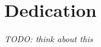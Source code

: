 
\chapter{Dedication}
\label{ch:Dedication}

\begin{epigraph}
    \emph{TODO: think about this} 
\end{epigraph}

\endinput


